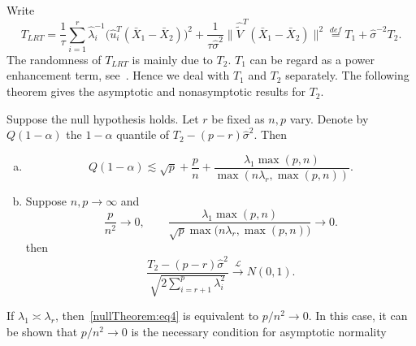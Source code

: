 Write
$$
T_{LRT}=\frac{1}{\tau}\sum_{i=1}^r \hat{\lambda}_i^{-1}\big(\hat{u}_i^T(\bar{X}_1-\bar{X}_2)\big)^2
+\frac{1}{\tau\hat{\sigma}^{2}} \|\hat{\tilde{V}}^T (\bar{X}_1-\bar{X}_2)\|^2
\overset{def}{=}T_1 + \hat{\sigma}^{-2}T_2.
$$
The randomness of $T_{LRT}$ is mainly due to $T_2$.
$T_1$ can be regard as a power enhancement term, see~\cite{Fan2015Power}.
Hence we deal with $T_1$ and $T_2$ separately.
The following theorem gives the asymptotic and nonasymptotic results for $T_2$.
\begin{theorem}\label{xxxTheorem}
    Suppose the null hypothesis holds.
    Let $r$ be fixed as $n,p$ vary.
    Denote by $Q(1-\alpha)$ the $1-\alpha$ quantile of $T_2-(p-r)\hat{\sigma}^2$.
    Then
    \begin{enumerate}[(a)]
        \item
            \begin{equation*}
    Q(1-\alpha)\lesssim 
        \sqrt{p}+\frac{p}{n}+\frac{\lambda_1\max(p,n)}{\max(n\lambda_r,\max(p,n))}.
            \end{equation*}
        \item
        Suppose $n,p\to \infty$ and
    \begin{equation}\label{nullTheorem:eq4}
        \frac{p}{n^2}\to 0,\quad \quad
        \frac{\lambda_1\max(p,n)}{\sqrt{p}\max\big(n\lambda_r,\max(p,n)\big)}\to 0.
    \end{equation}
        then
        $$\frac{T_2-(p-r)\hat{\sigma}^2}{\sqrt{2\sum_{i=r+1}^p \lambda_i^2}}\xrightarrow{\mathcal{L}}N(0,1).$$
    \end{enumerate}



\end{theorem}
\begin{remark}

    If $\lambda_1\asymp\lambda_r$, then~\eqref{nullTheorem:eq4} is equivalent to $p/n^2\to 0$.
In this case, it can be shown that $p/n^2\to 0$ is the necessary condition for asymptotic normality
\end{remark}
